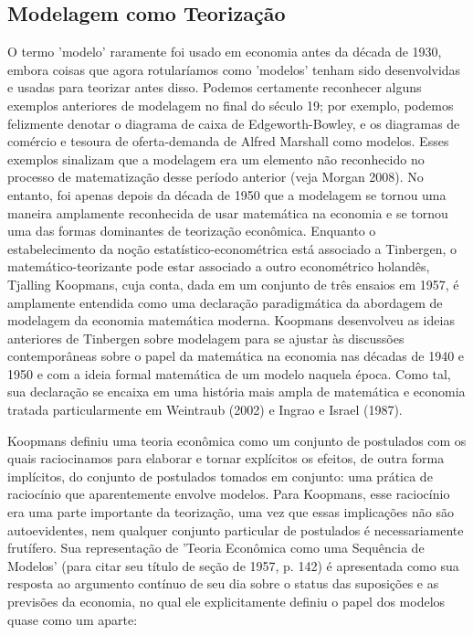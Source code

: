 \documentclass[12pt]{article}
\begin{document}
\subsection{\textbf{Modelagem como Teorização}}
O termo 'modelo' raramente foi usado em economia antes da década de 1930, embora coisas que agora rotularíamos como 'modelos' tenham sido desenvolvidas e usadas para teorizar antes disso. Podemos certamente reconhecer alguns exemplos anteriores de modelagem no final do século 19; por exemplo, podemos felizmente denotar o diagrama de caixa de Edgeworth-Bowley, e os diagramas de comércio e tesoura de oferta-demanda de Alfred Marshall como modelos. Esses exemplos sinalizam que a modelagem era um elemento não reconhecido no processo de matematização desse período anterior (veja Morgan 2008). No entanto, foi apenas depois da década de 1950 que a modelagem se tornou uma maneira amplamente reconhecida de usar matemática na economia e se tornou uma das formas dominantes de teorização econômica. Enquanto o estabelecimento da noção estatístico-econométrica está associado a Tinbergen, o matemático-teorizante pode estar associado a outro econométrico holandês, Tjalling Koopmans, cuja conta, dada em um conjunto de três ensaios em 1957, é amplamente entendida como uma declaração paradigmática da abordagem de modelagem da economia matemática moderna. Koopmans desenvolveu as ideias anteriores de Tinbergen sobre modelagem para se ajustar às discussões contemporâneas sobre o papel da matemática na economia nas décadas de 1940 e 1950 e com a ideia formal matemática de um modelo naquela época. Como tal, sua declaração se encaixa em uma história mais ampla de matemática e economia tratada particularmente em Weintraub (2002) e Ingrao e Israel (1987).

Koopmans definiu uma teoria econômica como um conjunto de postulados com os quais raciocinamos para elaborar e tornar explícitos os efeitos, de outra forma implícitos, do conjunto de postulados tomados em conjunto: uma prática de raciocínio que aparentemente envolve modelos. Para Koopmans, esse raciocínio era uma parte importante da teorização, uma vez que essas implicações não são autoevidentes, nem qualquer conjunto particular de postulados é necessariamente frutífero. Sua representação de 'Teoria Econômica como uma Sequência de Modelos' (para citar seu título de seção de 1957, p. 142) é apresentada como sua resposta ao argumento contínuo de seu dia sobre o status das suposições e as previsões da economia, no qual ele explicitamente definiu o papel dos modelos quase como um aparte:
\end{document}
